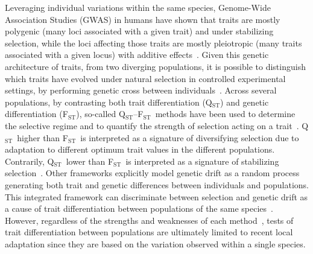 \documentclass{article}
\newcommand{\Qst}{Q$_\text{ST}$}
\newcommand{\Fst}{F$_\text{ST}$}
\newcommand{\QstFst}{\Qst--\Fst}
\begin{document}
Leveraging individual variations within the same species, Genome-Wide Association Studies (GWAS) in humans have shown that traits are mostly polygenic (many loci associated with a given trait) and under stabilizing selection, while the loci affecting those traits are mostly pleiotropic (many traits associated with a given locus) with additive effects~\citep{simons_population_2018, sella_thinking_2019}.
Given this genetic architecture of traits, from two diverging populations, it is possible to distinguish which traits have evolved under natural selection in controlled experimental settings, by performing genetic cross between individuals~\citep{fraser_detecting_2020}.
Across several populations, by contrasting both trait differentiation (\Qst) and genetic differentiation (\Fst), so-called \QstFst\ methods have been used to determine the selective regime and to quantify the strength of selection acting on a trait~\citep{merila_comparison_2001, leinonen_comparative_2008}.
\Qst\ higher than \Fst\ is interpreted as a signature of diversifying selection due to adaptation to different optimum trait values in the different populations.
Contrarily, \Qst\ lower than \Fst\ is interpreted as a signature of stabilizing selection~\citep{lamy_qst_2012}.
Other frameworks explicitly model genetic drift as a random process generating both trait and genetic differences between individuals and populations.
This integrated framework can discriminate between selection and genetic drift as a cause of trait differentiation between populations of the same species~\citep{ovaskainen_new_2011}.
However, regardless of the strengths and weaknesses of each method~\citep{pujol_are_2008, edelaar_comparisons_2011, ovaskainen_new_2011}, tests of trait differentiation between populations are ultimately limited to recent local adaptation since they are based on the variation observed within a single species.
\end{document}
